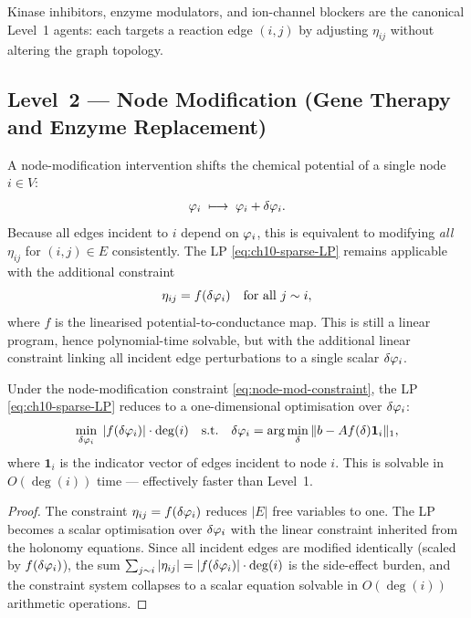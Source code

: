 Kinase inhibitors, enzyme modulators, and ion-channel blockers are the
canonical Level~1 agents: each targets a reaction edge $(i,j)$ by adjusting
$\eta_{ij}$ without altering the graph topology.

\subsection{Level~2 — Node Modification (Gene Therapy and Enzyme Replacement)}
\label{sec:level2}

A node-modification intervention shifts the chemical potential of a single
node $i \in V$:
\begin{equation}
  \varphi_i \;\longmapsto\; \varphi_i + \delta\varphi_i.
  \label{eq:node-shift}
\end{equation}
Because all edges incident to $i$ depend on $\varphi_i$, this is
equivalent to modifying \emph{all} $\eta_{ij}$ for $(i,j) \in E$ consistently.
The LP \eqref{eq:ch10-sparse-LP} remains applicable with the additional constraint
\begin{equation}
  \eta_{ij} = f(\delta\varphi_i) \quad \text{for all } j \sim i,
  \label{eq:node-mod-constraint}
\end{equation}
where $f$ is the linearised potential-to-conductance map.  This is still a
linear program, hence polynomial-time solvable, but with the additional
linear constraint linking all incident edge perturbations to a single scalar
$\delta\varphi_i$.

\begin{proposition}
\label{prop:level2-lp}
Under the node-modification constraint \eqref{eq:node-mod-constraint},
the LP \eqref{eq:ch10-sparse-LP} reduces to a one-dimensional optimisation over
$\delta\varphi_i$:
\[
  \min_{\delta\varphi_i} \; |f(\delta\varphi_i)| \cdot \deg(i)
  \quad \text{s.t.} \quad
  \delta\varphi_i = \arg\min_\delta \|b - A f(\delta) \mathbf{1}_i\|_1,
\]
where $\mathbf{1}_i$ is the indicator vector of edges incident to node $i$.
This is solvable in $O(\deg(i))$ time — effectively faster than Level~1.
\end{proposition}

\begin{proof}
The constraint $\eta_{ij} = f(\delta\varphi_i)$ reduces $|E|$ free
variables to one.  The LP becomes a scalar optimisation over $\delta\varphi_i$
with the linear constraint inherited from the holonomy equations.  Since all
incident edges are modified identically (scaled by $f(\delta\varphi_i)$),
the sum $\sum_{j \sim i} |\eta_{ij}| = |f(\delta\varphi_i)| \cdot \deg(i)$
is the side-effect burden, and the constraint system collapses to a scalar
equation solvable in $O(\deg(i))$ arithmetic operations.
\end{proof}


